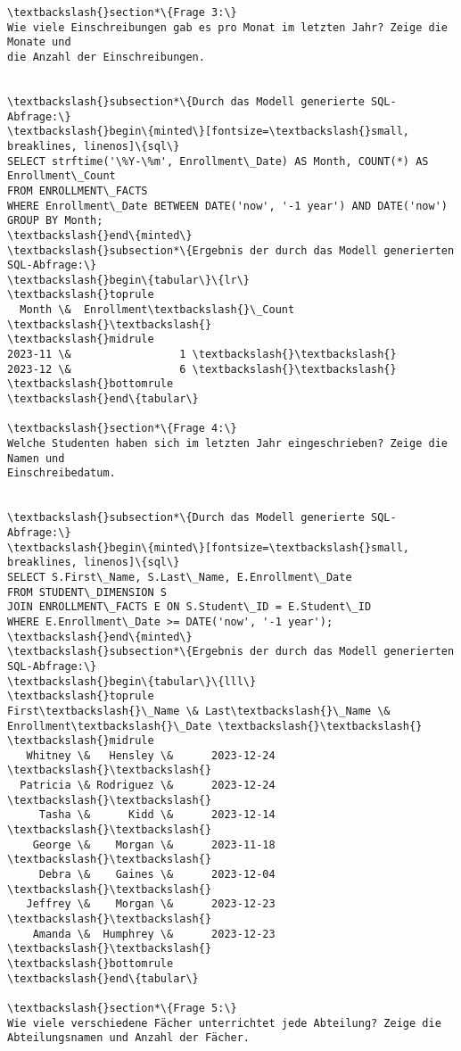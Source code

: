 \documentclass[11pt]{article}
\begin{document}
\begin{Verbatim}[commandchars=\\\{\}]
\textbackslash{}section*\{Frage 3:\}
Wie viele Einschreibungen gab es pro Monat im letzten Jahr? Zeige die Monate und
die Anzahl der Einschreibungen.


\textbackslash{}subsection*\{Durch das Modell generierte SQL-Abfrage:\}
\textbackslash{}begin\{minted\}[fontsize=\textbackslash{}small, breaklines, linenos]\{sql\}
SELECT strftime('\%Y-\%m', Enrollment\_Date) AS Month, COUNT(*) AS Enrollment\_Count
FROM ENROLLMENT\_FACTS
WHERE Enrollment\_Date BETWEEN DATE('now', '-1 year') AND DATE('now')
GROUP BY Month;
\textbackslash{}end\{minted\}
\textbackslash{}subsection*\{Ergebnis der durch das Modell generierten SQL-Abfrage:\}
\textbackslash{}begin\{tabular\}\{lr\}
\textbackslash{}toprule
  Month \&  Enrollment\textbackslash{}\_Count \textbackslash{}\textbackslash{}
\textbackslash{}midrule
2023-11 \&                 1 \textbackslash{}\textbackslash{}
2023-12 \&                 6 \textbackslash{}\textbackslash{}
\textbackslash{}bottomrule
\textbackslash{}end\{tabular\}

\textbackslash{}section*\{Frage 4:\}
Welche Studenten haben sich im letzten Jahr eingeschrieben? Zeige die Namen und
Einschreibedatum.


\textbackslash{}subsection*\{Durch das Modell generierte SQL-Abfrage:\}
\textbackslash{}begin\{minted\}[fontsize=\textbackslash{}small, breaklines, linenos]\{sql\}
SELECT S.First\_Name, S.Last\_Name, E.Enrollment\_Date
FROM STUDENT\_DIMENSION S
JOIN ENROLLMENT\_FACTS E ON S.Student\_ID = E.Student\_ID
WHERE E.Enrollment\_Date >= DATE('now', '-1 year');
\textbackslash{}end\{minted\}
\textbackslash{}subsection*\{Ergebnis der durch das Modell generierten SQL-Abfrage:\}
\textbackslash{}begin\{tabular\}\{lll\}
\textbackslash{}toprule
First\textbackslash{}\_Name \& Last\textbackslash{}\_Name \& Enrollment\textbackslash{}\_Date \textbackslash{}\textbackslash{}
\textbackslash{}midrule
   Whitney \&   Hensley \&      2023-12-24 \textbackslash{}\textbackslash{}
  Patricia \& Rodriguez \&      2023-12-24 \textbackslash{}\textbackslash{}
     Tasha \&      Kidd \&      2023-12-14 \textbackslash{}\textbackslash{}
    George \&    Morgan \&      2023-11-18 \textbackslash{}\textbackslash{}
     Debra \&    Gaines \&      2023-12-04 \textbackslash{}\textbackslash{}
   Jeffrey \&    Morgan \&      2023-12-23 \textbackslash{}\textbackslash{}
    Amanda \&  Humphrey \&      2023-12-23 \textbackslash{}\textbackslash{}
\textbackslash{}bottomrule
\textbackslash{}end\{tabular\}

\textbackslash{}section*\{Frage 5:\}
Wie viele verschiedene Fächer unterrichtet jede Abteilung? Zeige die
Abteilungsnamen und Anzahl der Fächer.



\end{Verbatim}
\end{document}
